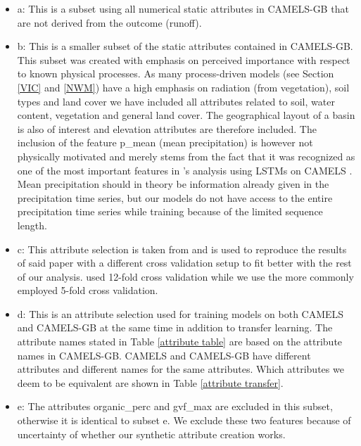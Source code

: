 \begin{itemize}
    \item a: This is a subset using all numerical static attributes in CAMELS-GB 
        \citep{CAMELS_GB} that are not derived from the outcome (runoff). 
    \item b: This is a smaller subset of the static attributes contained in CAMELS-GB. 
        This subset was created with emphasis on perceived importance with respect 
        to known physical processes. As many process-driven models (see Section \ref{VIC} and \ref{NWM}) have a high 
        emphasis on radiation (from vegetation), soil types and land cover we have 
        included all attributes related to soil, water content, vegetation and general land cover. 
        The geographical layout of a basin is also of interest and elevation attributes 
        are therefore included. The inclusion of the feature p\_mean (mean precipitation)
        is however not 
        physically motivated and merely stems from the fact that it was recognized 
        as one of the most important features in \citet{lstm_second_paper}'s analysis 
        using LSTMs on CAMELS \citep{CAMELS_US}. Mean precipitation should in 
        theory be information already given in the precipitation time series, but 
        our models do not have access to the entire precipitation time series while 
        training because of the limited sequence length. 
    \item c: This attribute selection is taken from \cite{lstm_third_paper} and 
        is used to reproduce the results of said paper with a different cross validation 
        setup to fit better with the rest of our analysis. \cite{lstm_third_paper} 
        used 12-fold cross validation while we use the more commonly employed 
        5-fold cross validation. 
    \item d: This is an attribute selection used for training models on both 
        CAMELS and CAMELS-GB at the same time in addition to transfer learning. 
        The attribute names stated in Table \ref{attribute table} are based on the 
        attribute names in CAMELS-GB. CAMELS and CAMELS-GB have different attributes 
        and different names for the same attributes. Which attributes we deem to 
        be equivalent are shown in Table \ref{attribute transfer}.
    \item e: The attributes organic\_perc and gvf\_max are excluded in this subset, 
        otherwise it is identical to subset e. We exclude these two features because 
        of uncertainty of whether our synthetic attribute creation works.
\end{itemize}

